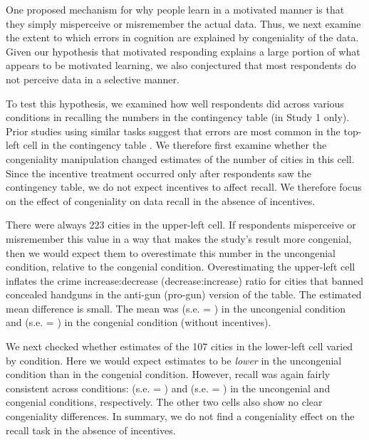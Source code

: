 One proposed mechanism for why people learn in a motivated manner is that they simply misperceive or misremember the actual data. Thus, we next examine the extent to which errors in cognition are explained by congeniality of the data. Given our hypothesis that motivated responding explains a large portion of what appears to be motivated learning, we also conjectured that most respondents do not perceive data in a selective manner.

To test this hypothesis, we examined how well respondents did across various conditions in recalling the numbers in the contingency table (in Study 1 only). Prior studies using similar tasks suggest that errors are most common in the top-left cell in the contingency table \citep{gilovich1991, dawson2002cella}. We therefore first examine whether the congeniality manipulation changed estimates of the number of cities in this cell. Since the incentive treatment occurred only after respondents saw the contingency table, we do not expect incentives to affect recall. We therefore focus on the effect of congeniality on data recall in the absence of incentives. 

There were always 223 cities in the upper-left cell. If respondents misperceive or misremember this value in a way that makes the study's result more congenial, then we would expect them to overestimate this number in the uncongenial condition, relative to the congenial condition. Overestimating the upper-left cell inflates the crime increase:decrease (decrease:increase) ratio for cities that banned concealed handguns in the anti-gun (pro-gun) version of the table. The estimated mean difference is small. The mean was  (s.e. = ) in the uncongenial condition and  (s.e. = ) in the congenial condition (without incentives).

We next checked whether estimates of the 107 cities in the lower-left cell varied by condition. Here we would expect estimates to be {\it lower} in the uncongenial condition than in the congenial condition. However, recall was again fairly consistent across conditions:  (s.e. = ) and  (s.e. = ) in the uncongenial and congenial conditions, respectively. The other two cells also show no clear congeniality differences. In summary, we do not find a congeniality effect on the recall task in the absence of incentives.

